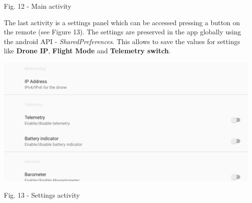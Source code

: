 \documentclass{IEEEtran}
\begin{document}
\begin{it}\begin{center}Fig. 12 - Main activity \end{center}\end{it}
The last activity is a settings panel which can be accessed pressing a button on the remote (see Figure 13). The settings are preserved in the app globally using the android API -  \textit{SharedPreferences}. This allows to save the values for settings like \textbf{Drone IP}, \textbf{Flight Mode} and  \textbf{Telemetry switch}.

\begin{center}\includegraphics[scale=.11]{sharedpreferences.jpg}\end{center}
\begin{it}\begin{center}Fig. 13 - Settings activity \end{center}\end{it}
\end{document}
